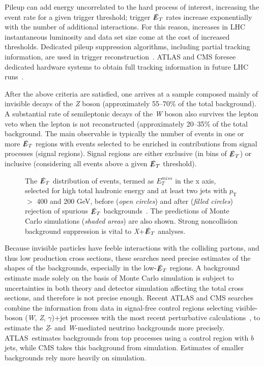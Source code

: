 \documentclass{ar-1col}
\newcommand{\IP}{invisible particle}
\newcommand{\pt}{\ensuremath{p_\mathrm{T}}\xspace}
\newcommand{\MET}{\ensuremath{\slashed{E}_T}\xspace}
\begin{document}
{\begin{textbox}
Pileup can add energy uncorrelated to the hard process of interest, increasing the event
rate for a given trigger threshold; trigger \MET rates increase
exponentially with the number of additional interactions. For this
reason, increases in LHC instantaneous luminosity and data set size
come at the cost of increased thresholds. Dedicated pileup
suppression algorithms, including partial tracking information, are
used in trigger
reconstruction~\cite{CMS:2014ata,ATLAS-CONF-2014-019}. ATLAS and
CMS foresee dedicated hardware systems to obtain full tracking
information in future LHC
runs~\cite{Shochet:2013gaw,1748-0221-6-12-C12065}.
\end{textbox}

After the above criteria are satisfied, one arrives at a sample composed mainly
of invisible decays of the \textit{Z} boson (approximately 55--70\% of the
total background). A substantial rate of semileptonic decays of
the \textit{W} boson also survives the lepton veto when the lepton is not
reconstructed (approximately 20--35\% of the total background.
The main observable is typically the number of events in one or
more \MET regions with events selected to be enriched in contributions from signal processes (signal regions). 
Signal regions are either exclusive (in bins of
\MET) or inclusive (considering all events above a given \MET
threshold).

\begin{figure}[!htpb]
\caption{The \MET distribution of events, termed as $E_T^{miss}$ in the x axis, selected for high total
hadronic energy and at least two jets with \pt{} $>$ 400 and 200
GeV, before (\textit{open circles}) and after (\textit{filled circles}) rejection of
spurious \MET backgrounds~\cite{CMS-PAS-JME-16-004}. The
predictions of Monte Carlo  simulations (\textit{shaded areas}) are also shown. Strong
noncollision background suppression is vital to \textit{X}+\MET analyses.}
\label{fig:fakeMET}
\end{figure}

Because {\IP}s have feeble interactions with the colliding
partons, and thus low production cross sections, these searches
need precise estimates of the shapes of the backgrounds, especially in the low-\MET regions.
A background estimate made solely on the basis of Monte Carlo simulation is subject to
uncertainties in both theory and detector simulation affecting the
total cross sections, and therefore is not precise enough. 
Recent ATLAS and CMS searches combine the information from data in signal-free
{control regions} selecting visible-boson (\textit{W},
\textit{Z}, $\gamma$)+jet processes with the most recent perturbative
calculations~\cite{Lindert:2017olm}, to
estimate the \textit{Z}- and \textit{W}-mediated neutrino backgrounds more precisely.
ATLAS\ estimates backgrounds from top processes using a
control region with $b$ jets, while CMS takes this background from
simulation. Estimates of smaller backgrounds rely more heavily on
simulation.

}
\end{document}
